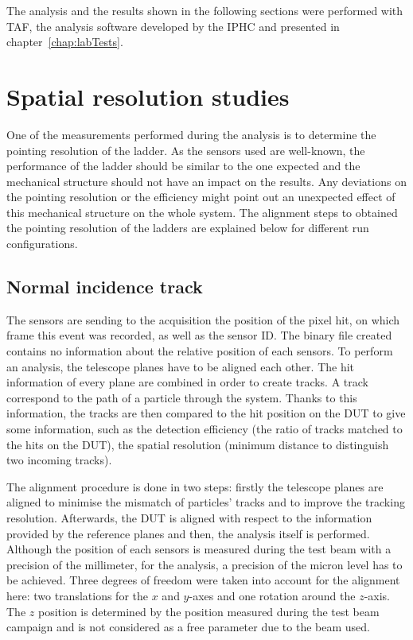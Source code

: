     The analysis and the results shown in the following sections were performed with \gls{TAF}, the analysis software developed by the IPHC and presented in chapter~\ref{chap:labTests}.

  \section{Spatial resolution studies}
   
    One of the measurements performed during the analysis is to determine the pointing resolution of the ladder.
    As the sensors used are well-known, the performance of the ladder should be similar to the one expected and the mechanical structure should not have an impact on the results.
    Any deviations on the pointing resolution or the efficiency might point out an unexpected effect of this mechanical structure on the whole system.
    The alignment steps to obtained the pointing resolution of the ladders are explained below for different run configurations. 

    \subsection{Normal incidence track}

    The sensors are sending to the acquisition the position of the pixel hit, on which frame this event was recorded, as well as the sensor ID.
    The binary file created contains no information about the relative position of each sensors.
    To perform an analysis, the telescope planes have to be aligned each other.
    The hit information of every plane are combined in order to create tracks. 
    A track correspond to the path of a particle through the system.
    Thanks to this information, the tracks are then compared to the hit position on the \gls{DUT} to give some information, such as the detection efficiency (the ratio of tracks matched to the hits on the \gls{DUT}), the spatial resolution (minimum distance to distinguish two incoming tracks).

    The alignment procedure is done in two steps: firstly the telescope planes are aligned to minimise the mismatch of particles' tracks and to improve the tracking resolution.
    Afterwards, the \gls{DUT} is aligned with respect to the information provided by the reference planes and then, the analysis itself is performed.
    Although the position of each sensors is measured during the test beam with a precision of the millimeter, for the analysis, a precision of the micron level has to be achieved.
    Three degrees of freedom were taken into account for the alignment here: two translations for the $x$ and $y$-axes and one rotation around the $z$-axis.
    The $z$ position is determined by the position measured during the test beam campaign and is not considered as a free parameter due to the beam used.

